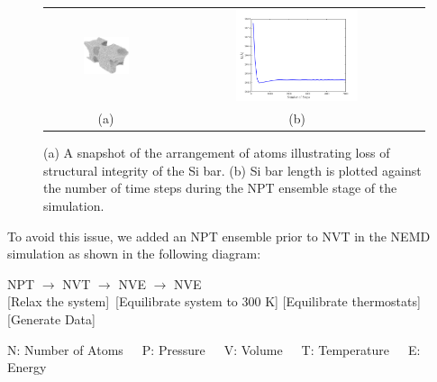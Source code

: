 \begin{figure}[htbp]
\begin{center}
\begin{tabular}{cc}
  \includegraphics[width=0.40\textwidth]{./Figures/unstable}
  &
  \hspace{3mm}
  \includegraphics[width=0.50\textwidth]{./Figures/lx_npt}
  \\ (a) & (b)
  \end{tabular}
\caption{(a) A snapshot of the arrangement of atoms illustrating loss of
structural integrity of the Si bar. 
(b) Si bar length is plotted against the number of time steps during
the NPT ensemble stage of the simulation.}
\label{fig:dgsm1}
\end{center}
\end{figure}

To avoid this issue, we added an NPT ensemble prior to NVT in the NEMD simulation as shown in the
following diagram:

\begin{center}

NPT \hspace{5mm} $\rightarrow$ \hspace{5mm} NVT \hspace{5mm} $\rightarrow$ \hspace{5mm} NVE \hspace{5mm}
$\rightarrow$ \hspace{5mm} NVE
\\ \vspace{1mm}
\tiny [Relax the system]~[Equilibrate system to 300 K] \hspace{1mm} [Equilibrate thermostats] \hspace{4mm}
 [Generate Data]
\\ \vspace{1mm}

\tiny{N: Number of Atoms~~~P: Pressure~~~V: Volume~~~T: Temperature~~~E: Energy}
\end{center}

